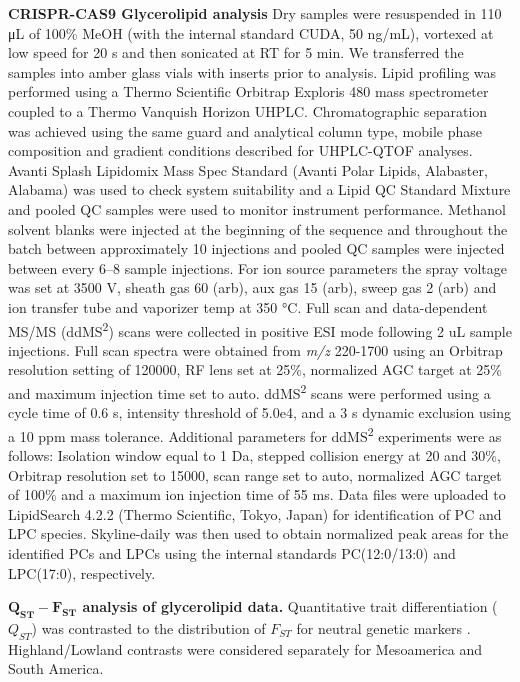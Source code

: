 \documentclass[9pt,twocolumn,twoside,lineno]{BioRxiv}
\begin{document}
\textbf{CRISPR-CAS9 Glycerolipid analysis}
Dry samples were resuspended in 110 μL of 100\% MeOH (with the internal standard CUDA, 50 ng/mL), vortexed at low speed for 20 s and then sonicated at RT for 5 min. We transferred the samples into amber glass vials with inserts prior to analysis. Lipid profiling was performed using a Thermo Scientific Orbitrap Exploris 480 mass spectrometer coupled to a Thermo Vanquish Horizon UHPLC. Chromatographic separation was achieved using the same guard and analytical column type, mobile phase composition and gradient conditions described for UHPLC-QTOF analyses. Avanti Splash Lipidomix Mass Spec Standard (Avanti Polar Lipids, Alabaster, Alabama) was used to check system suitability and a Lipid QC Standard Mixture and pooled QC samples were used to monitor instrument performance. Methanol solvent blanks were injected at the beginning of the sequence and throughout the batch between approximately 10 injections and pooled QC samples were injected between every 6–8 sample injections. For ion source parameters the spray voltage was set at 3500 V, sheath gas 60 (arb), aux gas 15 (arb), sweep gas 2 (arb) and ion transfer tube and vaporizer temp at 350 °C. Full scan and data-dependent MS/MS (ddMS\textsuperscript{2}) scans were collected in positive ESI mode following 2 uL sample injections. Full scan spectra were obtained from \textit{m/z} 220-1700 using an Orbitrap resolution setting of 120000, RF lens set at 25\%, normalized AGC target at 25\% and maximum injection time set to auto. ddMS\textsuperscript{2} scans were performed using a cycle time of 0.6 s, intensity threshold of 5.0e4, and a 3 s dynamic exclusion using a 10 ppm mass tolerance. Additional parameters for ddMS\textsuperscript{2} experiments were as follows: Isolation window equal to 1 Da, stepped collision energy at 20 and 30\%, Orbitrap resolution set to 15000, scan range set to auto, normalized AGC target of 100\% and a maximum ion injection time of 55 ms. Data files were uploaded to LipidSearch 4.2.2 (Thermo Scientific, Tokyo, Japan) for identification of PC and LPC species. Skyline-daily \cite{Adams2020-em} was then used to obtain normalized peak areas for the identified PCs and LPCs using the internal standards PC(12:0/13:0) and LPC(17:0), respectively.

\textbf{$\mathbf{Q_{ST}-F_{ST}}$ analysis of glycerolipid data.}
Quantitative trait differentiation ($Q_{ST}$) was contrasted to the distribution of $F_{ST}$ for neutral genetic markers \cite{whitlock2008evolutionary}.
Highland/Lowland contrasts were considered separately for Mesoamerica and South America.
\end{document}
